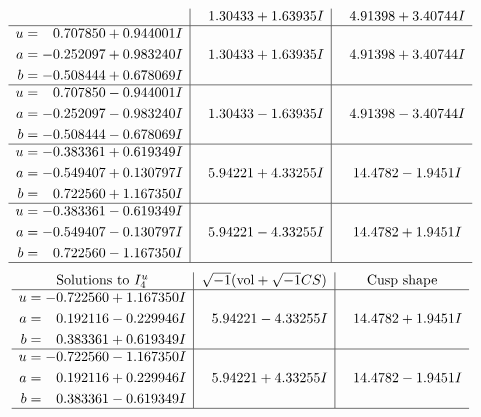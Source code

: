 \documentclass[1p]{elsarticle_modified}
\theoremstyle{definition}
\newcommand{\I}{\sqrt{-1}}
\begin{document}
$$\begin{array}{c|c|c}
 & \phantom{-}1.30433 + 1.63935 I & \phantom{-}4.91398 + 3.40744 I \\ \hline\begin{aligned}
u &= \phantom{-}0.707850 + 0.944001 I \\
a &= -0.252097 + 0.983240 I \\
b &= -0.508444 + 0.678069 I\end{aligned}
 & \phantom{-}1.30433 + 1.63935 I & \phantom{-}4.91398 + 3.40744 I \\ \hline\begin{aligned}
u &= \phantom{-}0.707850 - 0.944001 I \\
a &= -0.252097 - 0.983240 I \\
b &= -0.508444 - 0.678069 I\end{aligned}
 & \phantom{-}1.30433 - 1.63935 I & \phantom{-}4.91398 - 3.40744 I \\ \hline\begin{aligned}
u &= -0.383361 + 0.619349 I \\
a &= -0.549407 + 0.130797 I \\
b &= \phantom{-}0.722560 + 1.167350 I\end{aligned}
 & \phantom{-}5.94221 + 4.33255 I & \phantom{-}14.4782 - 1.9451 I \\ \hline\begin{aligned}
u &= -0.383361 - 0.619349 I \\
a &= -0.549407 - 0.130797 I \\
b &= \phantom{-}0.722560 - 1.167350 I\end{aligned}
 & \phantom{-}5.94221 - 4.33255 I & \phantom{-}14.4782 + 1.9451 I\\
 \hline 
 \end{array}$$\newpage$$\begin{array}{c|c|c}  
\text{Solutions to }I^u_{4}& \I (\text{vol} + \sqrt{-1}CS) & \text{Cusp shape}\\
 \hline 
\begin{aligned}
u &= -0.722560 + 1.167350 I \\
a &= \phantom{-}0.192116 - 0.229946 I \\
b &= \phantom{-}0.383361 + 0.619349 I\end{aligned}
 & \phantom{-}5.94221 - 4.33255 I & \phantom{-}14.4782 + 1.9451 I \\ \hline\begin{aligned}
u &= -0.722560 - 1.167350 I \\
a &= \phantom{-}0.192116 + 0.229946 I \\
b &= \phantom{-}0.383361 - 0.619349 I\end{aligned}
 & \phantom{-}5.94221 + 4.33255 I & \phantom{-}14.4782 - 1.9451 I\\
 \hline 
 \end{array}$$\newpage
\end{document}
